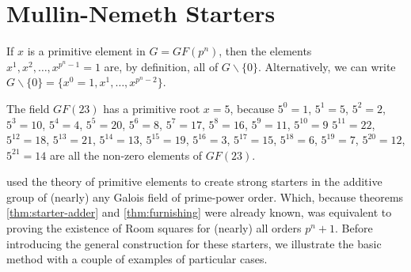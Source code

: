 \documentclass[11pt, a4paper]{book}\usepackage[]{graphicx}\usepackage[]{xcolor}
\newcounter{example}
\begin{document}
\section{Mullin-Nemeth Starters}

If $x$ is a primitive element in $G = GF(p^n)$, then the elements
$x^1, x^2, \ldots, x^{p^n - 1} = 1$ are, by definition, all of
$G \backslash \{0\}$. Alternatively, we can write
$G \backslash \{0\} = \{x^0 = 1, x^1, \ldots, x^{p^n - 2}\}$.

\begin{example}
The field $GF(23)$ has a primitive root $x = 5$, because
$5^0 = 1$, $5^1 = 5$, $5^2 = 2$, $5^3 = 10$, $5^4 = 4$,
$5^5 = 20$, $5^6 = 8$, $5^7 = 17$, $5^8 = 16$, $5^9 = 11$,
$5^{10} = 9$ $5^{11} = 22$, $5^{12} = 18$, $5^{13} = 21$,
$5^{14}  =13$, $5^{15} = 19$, $5^{16} = 3$, $5^{17} = 15$,
$5^{18} = 6$, $5^{19} = 7$, $5^{20} = 12$, $5^{21} = 14$
are all the non-zero elements of $GF(23)$.
\end{example}

\cite{mullinFurnishingRoomSquares1969}
used the theory
of primitive elements to create strong starters in the
additive group of (nearly) any Galois field of prime-power
order. Which, because theorems
\ref{thm:starter-adder}
and
\ref{thm:furnishing}
were already
known, was equivalent to proving the existence of Room
squares for (nearly) all orders $p^n + 1$. Before
introducing the general construction for these starters, we
illustrate the basic method with a couple of examples of
particular cases.
\end{document}

